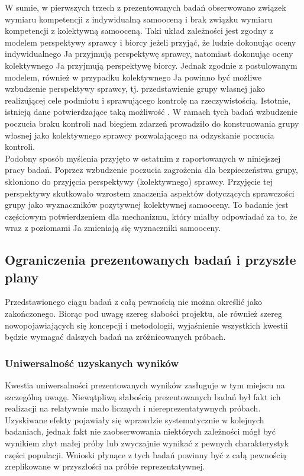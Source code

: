\documentclass[man]{apa6}
\begin{document}
W sumie, w pierwszych trzech z prezentowanych badań obserwowano związek wymiaru kompetencji z indywidualną samooceną i brak związku wymiaru kompetencji z kolektywną samooceną. Taki układ zależności jest zgodny z modelem perspektywy sprawcy i biorcy \parencite{abele2014communal} jeżeli przyjąć, że ludzie dokonując oceny indywidualnego Ja przyjmują perspektywę sprawcy, natomiast dokonując oceny kolektywnego Ja przyjmują perspektywę biorcy. Jednak zgodnie z postulowanym modelem, również w przypadku kolektywnego Ja powinno być możliwe wzbudzenie perspektywy sprawcy, tj. przedstawienie grupy własnej jako realizującej cele podmiotu i sprawującego kontrolę na rzeczywistością. Istotnie, istnieją dane potwierdzające taką możliwość \parencite{fritsche2013power}. W ramach tych badań wzbudzenie poczucia braku kontroli nad biegiem zdarzeń prowadziło do konstruowania grupy własnej jako kolektywnego sprawcy pozwalającego na odzyskanie poczucia kontroli.\\

Podobny sposób myślenia przyjęto w ostatnim z raportowanych w niniejszej pracy badań. Poprzez wzbudzenie poczucia zagrożenia dla bezpieczeństwa grupy, skłoniono do przyjęcia perspektywy (kolektywnego) sprawcy. Przyjęcie tej perspektywy skutkowało wzrostem znaczenia aspektów dotyczących sprawczości grupy jako wyznaczników pozytywnej kolektywnej samooceny. To badanie jest częściowym potwierdzeniem dla mechanizmu, który miałby odpowiadać za to, że wraz z poziomami Ja zmieniają się wyznaczniki samooceny.\\

\subsection{Ograniczenia prezentowanych badań i przyszłe plany}

Przedstawionego ciągu badań z całą pewnością nie można określić jako zakończonego. Biorąc pod uwagę szereg słabości projektu, ale również szereg nowopojawiających się koncepcji i metodologii, wyjaśnienie wszystkich kwestii będzie wymagać dalszych badań na zróżnicowanych próbach. \\

\subsubsection{Uniwersalność uzyskanych wyników}

Kwestia uniwersalności prezentowanych wyników zasługuje w tym miejscu na szczególną uwagę. Niewątpliwą słabością prezentowanych badań był fakt ich realizacji na relatywnie mało licznych i niereprezentatywnych próbach. Uzyskiwane efekty pojawiały się wprawdzie systematycznie w kolejnych badaniach, jednak fakt nie zaobserwowania niektórych zależności mógł być wynikiem zbyt małej próby lub zwyczajnie wynikać z pewnych charakterystyk części populacji. Wnioski płynące z tych badań powinny być z całą pewnością zreplikowane w przyszłości na próbie reprezentatywnej. \\
\end{document}
